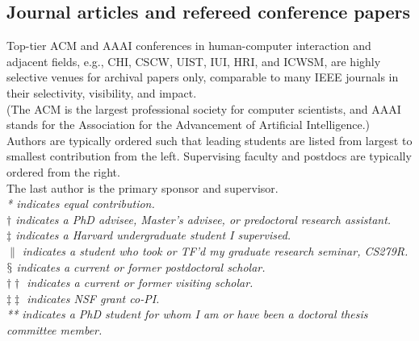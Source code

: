 \documentclass[10pt, a4paper]{article}
\newcommand{\years}[1]{\marginnote{\normalsize #1}}
\begin{document}
\subsection*{Journal articles and refereed conference papers}
\noindent
Top-tier ACM and AAAI conferences in human-computer interaction and adjacent fields, e.g., CHI, CSCW, UIST, IUI, HRI, and ICWSM, are highly selective venues for archival papers only, comparable to many IEEE journals in their selectivity, visibility, and impact.\\[0.1cm]
(The ACM is the largest professional society for computer scientists, and AAAI stands for the Association for the Advancement of Artificial Intelligence.)\\[0.1cm]
Authors are typically ordered such that leading students are listed from largest to smallest contribution from the left. Supervising faculty and postdocs are typically ordered from the right. \\
The last author is the primary sponsor and supervisor.\\[0.2cm] %
\emph{* indicates equal contribution.}\\
\emph{$\dagger$ indicates a PhD advisee, Master's advisee, or predoctoral research assistant.}\\
\emph{$\ddagger$ indicates a Harvard undergraduate student I supervised.}\\
\emph{$\|$ indicates a student who took or TF'd my graduate research seminar, CS279R.}\\
\emph{$\mathsection$ indicates a current or former postdoctoral scholar.}\\
\emph{$\dagger\dagger$ indicates a current or former visiting scholar.}\\
\emph{$\ddagger\ddagger$ indicates NSF grant co-PI.}\\
\emph{** indicates a PhD student for whom I am or have been a doctoral thesis committee member.}
\end{document}
